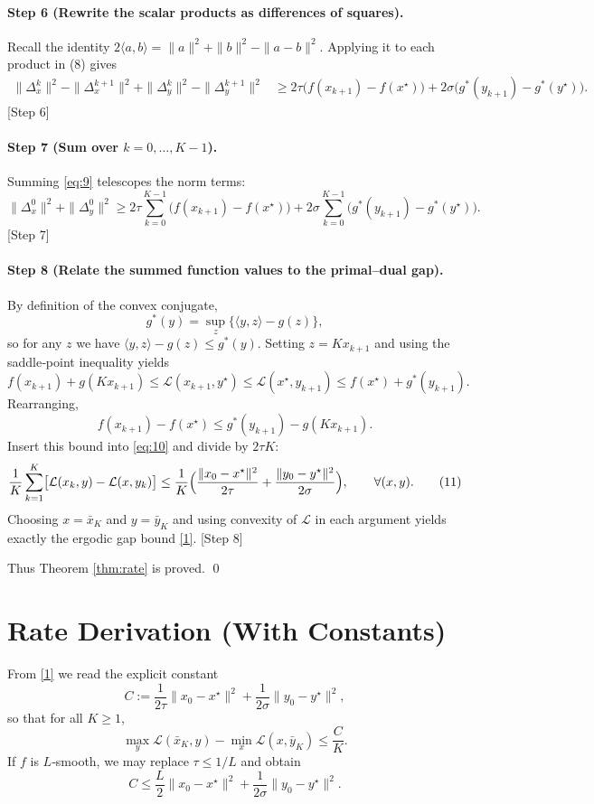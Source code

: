 \documentclass{article}
\begin{document}
\paragraph{Step 6 (Rewrite the scalar products as differences of squares).}
Recall the identity $2\langle a,b\rangle = \|a\|^{2}+\|b\|^{2}-\|a-b\|^{2}$. Applying it to each product in (8) gives
\[
\begin{aligned}
\|\Delta_{x}^{k}\|^{2}-\|\Delta_{x}^{k+1}\|^{2}
+\|\Delta_{y}^{k}\|^{2}-\|\Delta_{y}^{k+1}\|^{2}
&\ge
2\tau\bigl(f(x_{k+1})-f(x^{\star})\bigr)
+2\sigma\bigl(g^{*}(y_{k+1})-g^{*}(y^{\star})\bigr).
\end{aligned}
\tag{9}
\]
[Step 6]

\paragraph{Step 7 (Sum over $k=0,\dots,K-1$).}
Summing \eqref{eq:9} telescopes the norm terms:
\[
\|\Delta_{x}^{0}\|^{2}+\|\Delta_{y}^{0}\|^{2}
\ge
2\tau\sum_{k=0}^{K-1}\bigl(f(x_{k+1})-f(x^{\star})\bigr)
+2\sigma\sum_{k=0}^{K-1}\bigl(g^{*}(y_{k+1})-g^{*}(y^{\star})\bigr).
\tag{10}
\]
[Step 7]

\paragraph{Step 8 (Relate the summed function values to the primal–dual gap).}
By definition of the convex conjugate,
\[
g^{*}(y)=\sup_{z}\{\langle y,z\rangle-g(z)\},
\]
so for any $z$ we have $\langle y,z\rangle-g(z)\le g^{*}(y)$. Setting $z=Kx_{k+1}$ and using the saddle‑point inequality yields
\[
f(x_{k+1})+g(Kx_{k+1})\le \mathcal{L}(x_{k+1},y^{\star})
\le \mathcal{L}(x^{\star},y_{k+1})\le f(x^{\star})+g^{*}(y_{k+1}).
\]
Rearranging,
\[
f(x_{k+1})-f(x^{\star})\le g^{*}(y_{k+1})-g(Kx_{k+1}).
\]
Insert this bound into \eqref{eq:10} and divide by $2\tau K$:
\[
\frac{1}{K}\sum_{k=1}^{K}\bigl[\mathcal{L}(x_{k},y)-\mathcal{L}(x,y_{k})\bigr]
\le
\frac{1}{K}\Bigl(\frac{\|x_{0}-x^{\star}\|^{2}}{2\tau}
+\frac{\|y_{0}-y^{\star}\|^{2}}{2\sigma}\Bigr),
\qquad\forall (x,y).
\tag{11}
\]
Choosing $x=\bar{x}_{K}$ and $y=\bar{y}_{K}$ and using convexity of $\mathcal{L}$ in each argument yields exactly the ergodic gap bound \eqref{1}.
[Step 8]

Thus Theorem \ref{thm:rate} is proved. \qed

\section*{Rate Derivation (With Constants)}
From \eqref{1} we read the explicit constant
\[
C:=\frac{1}{2\tau}\|x_{0}-x^{\star}\|^{2}
    +\frac{1}{2\sigma}\|y_{0}-y^{\star}\|^{2},
\]
so that for all $K\ge1$,
\[
\max_{y}\mathcal{L}(\bar{x}_{K},y)-\min_{x}\mathcal{L}(x,\bar{y}_{K})
\le \frac{C}{K}.
\]
If $f$ is $L$‑smooth, we may replace $\tau\le 1/L$ and obtain
\[
C\le \frac{L}{2}\|x_{0}-x^{\star}\|^{2}
    +\frac{1}{2\sigma}\|y_{0}-y^{\star}\|^{2}.
\]
\end{document}

